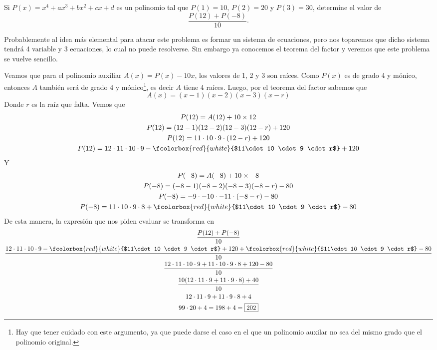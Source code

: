 \begin{section-problem}
    Si $P(x) = x^4 + ax^3 + bx^2 + cx + d$ es un polinomio tal que $P(1) = 10$, $P(2) = 20$ y $P(3) = 30$, determine el valor de
    \[\frac{P(12) + P(-8)}{10}.\]

    Probablemente al idea más elemental para atacar este problema es formar un sistema de ecuaciones, pero nos toparemos que dicho sistema tendrá 4 variable y 3 ecuaciones, lo cual no puede resolverse.
    Sin embargo ya conocemos el teorema del factor y veremos que este problema se vuelve sencillo.

    \begin{solution}
        Veamos que para el polinomio auxiliar $A(x) = P(x) - 10x$, los valores de 1, 2 y 3 son raíces.
        Como $P(x)$ es de grado 4 y mónico, entonces $A$ también será de grado 4 y mónico\footnote{Hay que tener cuidado con este argumento, ya que puede darse el caso en el que un polinomio auxilar no sea del mismo grado que el polinomio original.}, es decir $A$ tiene 4 raíces.
        Luego, por el teorema del factor sabemos que
        \[A(x) = (x - 1)(x - 2)(x - 3)(x - r)\]
        Donde $r$ es la raíz que falta.
        Vemos que
        \begin{gather*}
            P(12) = A(12) + 10\times 12\\
            P(12) = (12 - 1)(12 - 2)(12 - 3)(12 - r) + 120\\
            P(12) = 11\cdot 10 \cdot 9 \cdot (12 - r) + 120\\
            P(12) = 12\cdot 11\cdot 10 \cdot 9 - \fcolorbox{red}{white}{$11\cdot 10 \cdot 9 \cdot r$} + 120
        \end{gather*}
        Y
        \begin{gather*}
            P(-8) = A(-8) + 10\times -8\\
            P(-8) = (-8 - 1)(-8 - 2)(-8 - 3)(-8 - r) - 80\\
            P(-8) = -9\cdot -10 \cdot -11 \cdot (-8 - r) - 80\\
            P(-8) = 11\cdot 10\cdot 9 \cdot 8  + \fcolorbox{red}{white}{$11\cdot 10 \cdot 9 \cdot r$} - 80
        \end{gather*}
        De esta manera, la expresión que nos piden evaluar se transforma en
        \begin{gather*}
            \frac{P(12) + P(-8)}{10}\\
            \frac{12\cdot 11\cdot 10 \cdot 9 - \fcolorbox{red}{white}{$11\cdot 10 \cdot 9 \cdot r$} + 120 + \fcolorbox{red}{white}{$11\cdot 10 \cdot 9 \cdot r$} - 80}{10}\\
            \frac{12\cdot 11\cdot 10 \cdot 9 + 11\cdot 10\cdot 9 \cdot 8 + 120 - 80}{10}\\
            \frac{10(12\cdot 11 \cdot 9 + 11 \cdot 9 \cdot 8) + 40}{10}\\
            12\cdot 11 \cdot 9 + 11 \cdot 9 \cdot 8 + 4 \\ 99\cdot 20 + 4 = 198 + 4 = \boxed{202}
        \end{gather*}
    \end{solution}
\end{section-problem}

